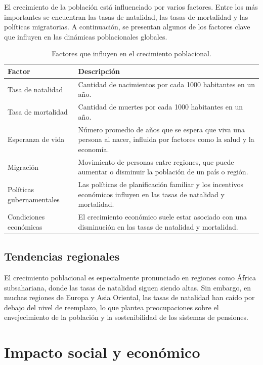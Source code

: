 El crecimiento de la población está influenciado por varios factores. Entre los más importantes se encuentran las tasas de natalidad, las tasas de mortalidad y las políticas migratorias. A continuación, se presentan algunos de los factores clave que influyen en las dinámicas poblacionales globales.

\begin{table}[!ht]
\sf\footnotesize\setlength\tabcolsep{4pt}
\centering
\begin{tabular}{>{\raggedright\arraybackslash}m{3.4cm} | >{\raggedright\arraybackslash}m{7cm}}
\toprule
\textbf{Factor} & \textbf{Descripción}\\
\midrule
Tasa de natalidad & Cantidad de nacimientos por cada \num{1000} habitantes en un año. \\
\midrule
Tasa de mortalidad & Cantidad de muertes por cada \num{1000} habitantes en un año. \\
\midrule
Esperanza de vida & Número promedio de años que se espera que viva una persona al nacer, influida por factores como la salud y la economía. \\
\midrule
Migración & Movimiento de personas entre regiones, que puede aumentar o disminuir la población de un país o región. \\
\midrule
Políticas gubernamentales & Las políticas de planificación familiar y los incentivos económicos influyen en las tasas de natalidad y mortalidad. \\
\midrule
Condiciones económicas & El crecimiento económico suele estar asociado con una disminución en las tasas de natalidad y mortalidad. \\
\bottomrule
\end{tabular}
\caption{Factores que influyen en el crecimiento poblacional.}
\label{tabla2}
\end{table}

\subsection{Tendencias regionales}

El crecimiento poblacional es especialmente pronunciado en regiones como África subsahariana, donde las tasas de natalidad siguen siendo altas. Sin embargo, en muchas regiones de Europa y Asia Oriental, las tasas de natalidad han caído por debajo del nivel de reemplazo, lo que plantea preocupaciones sobre el envejecimiento de la población y la sostenibilidad de los sistemas de pensiones.

\section{Impacto social y económico}


